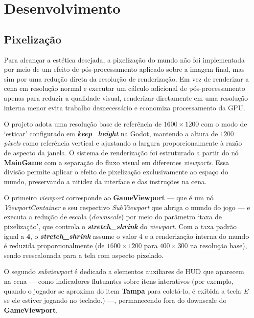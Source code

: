 
\chapter{Desenvolvimento}
\label{cap:desenvolvimento}

\section{Pixelização}
\label{sec:pixelizacao}

Para alcançar a estética desejada, a pixelização do mundo não foi
implementada por meio de um efeito de pós-processamento aplicado sobre a
imagem final, mas sim por uma redução direta da resolução de renderização.
Em vez de renderizar a cena em resolução normal e executar um cálculo
adicional de pós-processamento apenas para reduzir a qualidade visual,
renderizar diretamente em uma resolução interna menor evita trabalho
desnecessário e economiza processamento da GPU.

O projeto adota uma resolução base de referência de $1600 \times 1200$ com o modo
de `esticar' configurado em \textbf{\textit{keep\_height}} na Godot, mantendo a altura de $1200$ \textit{pixels} como
referência vertical e ajustando a largura proporcionalmente à razão de aspecto da janela. O sistema de renderização foi estruturado a
partir do nó \textbf{MainGame} com a separação do fluxo visual em diferentes \textit{viewports}.
Essa divisão permite aplicar o efeito de pixelização exclusivamente ao espaço
do mundo, preservando a nitidez da interface e das instruções na cena.

O primeiro \textit{viewport} corresponde ao \textbf{GameViewport} --- que é um nó \textit{ViewportContainer} e seu respectivo
\textit{SubViewport} que abriga o mundo do jogo --- e executa a redução de escala
(\textit{downscale}) por meio do parâmetro `taxa de pixelização', que controla o
\textbf{\textit{stretch\_shrink}} do \textit{viewport}. Com a taxa padrão igual a \textbf{4}, o \textbf{\textit{stretch\_shrink}}
assume o valor 4 e a renderização interna do mundo é reduzida
proporcionalmente (de $1600 \times 1200$ para $400 \times 300$ na resolução base), sendo
reescalonada para a tela com aspecto pixelado.

O segundo \textit{subviewport} é dedicado a elementos auxiliares de HUD que
aparecem na cena --- como indicadores flutuantes sobre itens interativos
(por exemplo, quando o jogador se aproxima do item \textbf{Tampa} para coletá-lo,
é exibida a tecla \textit{E} se ele estiver jogando no teclado.) ---, permanecendo fora do
downscale do \textbf{GameViewport}.

